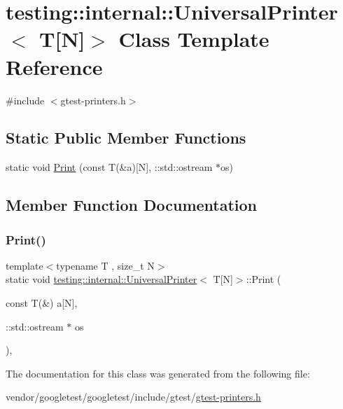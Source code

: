 \hypertarget{classtesting_1_1internal_1_1_universal_printer_3_01_t[_n]_4}{}\section{testing\+:\+:internal\+:\+:Universal\+Printer$<$ T\mbox{[}N\mbox{]}$>$ Class Template Reference}
\label{classtesting_1_1internal_1_1_universal_printer_3_01_t[_n]_4}


{\ttfamily \#include $<$gtest-\/printers.\+h$>$}

\subsection*{Static Public Member Functions}
\begin{DoxyCompactItemize}
\item 
static void \hyperlink{classtesting_1_1internal_1_1_universal_printer_3_01_t[_n]_4_a1cf0e7c8db59c090f769116c6421b212}{Print} (const T(\&a)\mbox{[}N\mbox{]}, \+::std\+::ostream $\ast$os)
\end{DoxyCompactItemize}


\subsection{Member Function Documentation}
\mbox{\label{classtesting_1_1internal_1_1_universal_printer_3_01_t[_n]_4_a1cf0e7c8db59c090f769116c6421b212}} 
\subsubsection{\texorpdfstring{Print()}{Print()}}
{\footnotesize\ttfamily template$<$typename T , size\+\_\+t N$>$ \\
static void \hyperlink{classtesting_1_1internal_1_1_universal_printer}{testing\+::internal\+::\+Universal\+Printer}$<$ T\mbox{[}N\mbox{]}$>$\+::Print (\begin{DoxyParamCaption}\item[{const T(\&)}]{a\mbox{[}\+N\mbox{]},  }\item[{\+::std\+::ostream $\ast$}]{os }\end{DoxyParamCaption})\hspace{0.3cm}{\ttfamily [inline]}, {\ttfamily [static]}}



The documentation for this class was generated from the following file\+:\begin{DoxyCompactItemize}
\item 
vendor/googletest/googletest/include/gtest/\hyperlink{gtest-printers_8h}{gtest-\/printers.\+h}\end{DoxyCompactItemize}
